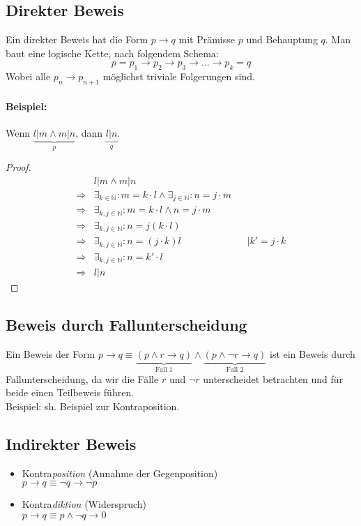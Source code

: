\documentclass[10pt,a4paper]{article}
\begin{document}
\subsection{Direkter Beweis}
Ein direkter Beweis hat die Form $p\rightarrow q$ mit Prämisse $p$ und Behauptung $q$. Man baut eine \glqq logische Kette\grqq , nach folgendem Schema:
\[
p=p_1\rightarrow p_2 \rightarrow p_3 \rightarrow \ldots \rightarrow p_k=q
\]
Wobei alle $p_n\rightarrow p_{n+1}$ möglichst triviale Folgerungen sind.

\paragraph{Beispiel:}Wenn $\underbrace{l|m \land m|n}_{p}$, dann $\underbrace{l|n}_{q}$.
\begin{proof}
\begin{align}
&l|m \land m|n \\
\Rightarrow &\exists_{k\in\mathbb{N}}: m=k\cdot l \land \exists_{j\in\mathbb{N}}: n=j\cdot m \\
\Rightarrow &\exists_{k,j\in\mathbb{N}}: m=k\cdot l \land n=j\cdot m \\
\Rightarrow &\exists_{k,j\in\mathbb{N}}: n=j(k\cdot l) \\
\Rightarrow &\exists_{k,j\in\mathbb{N}}: n=(j\cdot k)l && \mid k'=j\cdot k \\
\Rightarrow &\exists_{k,j\in\mathbb{N}}: n=k' \cdot l \\
\Rightarrow &l|n
\end{align}
\end{proof}

\subsection{Beweis durch Fallunterscheidung}
Ein Beweis der Form $p\rightarrow q \equiv \underbrace{(p\land r\rightarrow q)}_\text{Fall 1} \land \underbrace{(p\land\neg r \rightarrow q)}_\text{Fall 2}$ ist ein Beweis durch Fallunterscheidung, da wir die Fälle $r$ und $\neg r$ unterscheidet betrachten und für beide einen Teilbeweis führen.\\
Beispiel: sh. Beispiel zur Kontraposition.
\subsection{Indirekter Beweis}
\begin{itemize}
\item Kontra\emph{position} (Annahme der Gegenposition) \\
$p\rightarrow q \equiv \neg q \rightarrow\neg p$
\item Kontra\emph{diktion} (Widerspruch) \\
$p\rightarrow q \equiv p \land\neg q \rightarrow 0$
\end{itemize}
\end{document}
